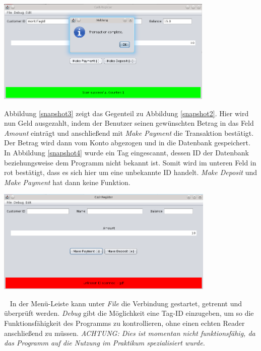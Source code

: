 \documentclass[11pt]{article} %
\begin{document}
\begin{center}
\includegraphics[height=5cm,keepaspectratio]{snapshot3.png}
\label{snapshot3}
\end{center}
Abbildung \ref{snapshot3} zeigt das Gegenteil zu Abbildung \ref{snapshot2}. Hier
wird nun Geld ausgezahlt, indem der Benutzer seinen gewünschten Betrag in das
Feld \textit{Amount} einträgt und anschließend mit \textit{Make Payment} die
Transaktion bestätigt. Der Betrag wird dann vom Konto abgezogen und in die
Datenbank gespeichert.
\newline
\newline
In Abbildung \ref{snapshot4} wurde ein Tag eingescannt, dessen ID der Datenbank
beziehungsweise dem Programm nicht bekannt ist. Somit wird im unteren Feld in
rot bestätigt, dass es sich hier um eine unbekannte ID handelt. \textit{Make
Deposit} und \textit{Make Payment} hat dann keine Funktion.
\begin{center}
\includegraphics[height=5cm,keepaspectratio]{snapshot4.png}
\label{snapshot4}
\end{center}
~\newline
In der Menü-Leiste kann unter \textit{File} die Verbindung gestartet, getrennt
und überprüft werden. \textit{Debug} gibt die Möglichkeit eine Tag-ID
einzugeben, um so die Funktionsfähigkeit des Programms zu kontrollieren, ohne einen echten
Reader anschließend zu müssen.
\newline
\textit{ACHTUNG: Dies ist momentan nicht funktionsfähig, da das Programm auf
die Nutzung im Praktikum spezialisiert wurde.}
\end{document}

